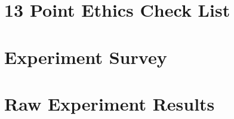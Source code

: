 \documentclass[11pt,openright,twoside,a4paper]{report}
\begin{document}
\chapter{13 Point Ethics Check List}
\label{ch:appendix-ethics-checklist}


\chapter{Experiment Survey}
\label{ch:appendix-experiment-survey}


\chapter{Raw Experiment Results}
\label{ch:appendix-survey-results}





\end{document}
